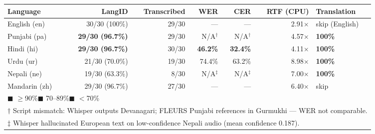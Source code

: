 \documentclass[11pt,a4paper]{article}
\begin{document}
{\small
\begin{tabular}{lrrrrrl}
\toprule
\rowcolor{Navy}
\color{white}\textbf{Language} &
\color{white}\textbf{LangID} &
\color{white}\textbf{Transcribed} &
\color{white}\textbf{WER} &
\color{white}\textbf{CER} &
\color{white}\textbf{RTF (CPU)} &
\color{white}\textbf{Translation}\\
\midrule
\rowcolor{LGreen}English (en)   & 30/30 (100\%)        & 29/30 & --- & --- & 2.91$\times$ & skip (English)\\
\rowcolor{LGreen}Punjabi (pa)   & \textbf{29/30 (96.7\%)} & 29/30 & N/A$^\dagger$ & N/A$^\dagger$ & 4.57$\times$ & \textbf{100\%}\\
\rowcolor{LGreen}Hindi (hi)     & \textbf{29/30 (96.7\%)} & 30/30 & \textbf{46.2\%} & \textbf{32.4\%} & 4.11$\times$ & \textbf{100\%}\\
\rowcolor{LAmber}Urdu (ur)      & 21/30 (70.0\%)       & 19/30 & 74.4\% & 63.2\% & 8.98$\times$ & \textbf{100\%}\\
\rowcolor{LRed}Nepali (ne)    & 19/30 (63.3\%)       & 8/30  & N/A$^\ddagger$ & N/A$^\ddagger$ & 7.00$\times$ & \textbf{100\%}\\
\rowcolor{LGreen}Mandarin (zh)  & 29/30 (96.7\%)       & 27/30 & ---  & ---  & 6.40$\times$ & skip\\
\bottomrule
\multicolumn{7}{l}{\footnotesize\textcolor{DGreen}{$\blacksquare$} $\geq$90\%\quad\textcolor{Amber}{$\blacksquare$} 70--89\%\quad\textcolor{DRed}{$\blacksquare$} $<$70\%}\\
\multicolumn{7}{l}{\footnotesize $\dagger$ Script mismatch: Whisper outputs Devanagari; FLEURS Punjabi references in Gurmukhi --- WER not comparable.}\\
\multicolumn{7}{l}{\footnotesize $\ddagger$ Whisper hallucinated European text on low-confidence Nepali audio (mean confidence 0.187).}\\
\end{tabular}
}

\vspace{5pt}
\end{document}
